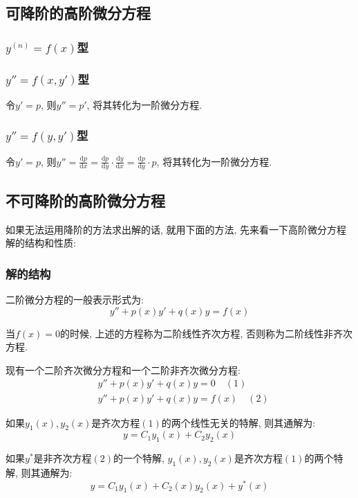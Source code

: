 \subsection{可降阶的高阶微分方程}
\subsubsection{$ y^{(n)}=f(x) $型}
\subsubsection{$ y''=f(x,y') $型}
令$ y'=p $, 则$ y''=p' $, 将其转化为一阶微分方程.
\subsubsection{$ y''=f(y,y') $型}
令$ y'=p $, 则$ y''=\frac{\mathrm{d}p}{\mathrm{d}x}=\frac{\mathrm{d}p}{\mathrm{d}y}\cdot \frac{\mathrm{d}y}{\mathrm{d}x}=\frac{\mathrm{d}p}{\mathrm{d}y}\cdot p $, 将其转化为一阶微分方程.
\subsection{不可降阶的高阶微分方程}
如果无法运用降阶的方法求出解的话, 就用下面的方法, 先来看一下高阶微分方程解的结构和性质:
\subsubsection{解的结构}
二阶微分方程的一般表示形式为:
\begin{equation*}
y''+p(x)y'+q(x)y=f(x)
\end{equation*}\par
当$ f(x)=0 $的时候, 上述的方程称为二阶线性齐次方程, 否则称为二阶线性非齐次方程.\par 现有一个二阶齐次微分方程和一个二阶非齐次微分方程:
\begin{equation*}
\begin{aligned}
& y''+p(x)y'+q(x)y=0 \quad (1) \\
& y''+p(x)y'+q(x)y=f(x) \quad (2)
\end{aligned}
\end{equation*}
\par \vspace{.5em}
如果$ y_{1}(x),y_{2}(x) $是齐次方程$ (1) $的两个线性无关的特解, 则其通解为:
\begin{equation*}
y=C_{1}y_{1}(x)+C_{2}y_{2}(x)
\end{equation*}
\par \vspace{.5em}
如果$ y^{*} $是非齐次方程$ (2) $的一个特解, $ y_{1}(x),y_{2}(x) $是齐次方程$ (1) $的两个特解, 则其通解为:
\begin{equation*}
y=C_{1}y_{1}(x)+C_{2}(x)y_{2}(x)+y^{*}(x)
\end{equation*}

